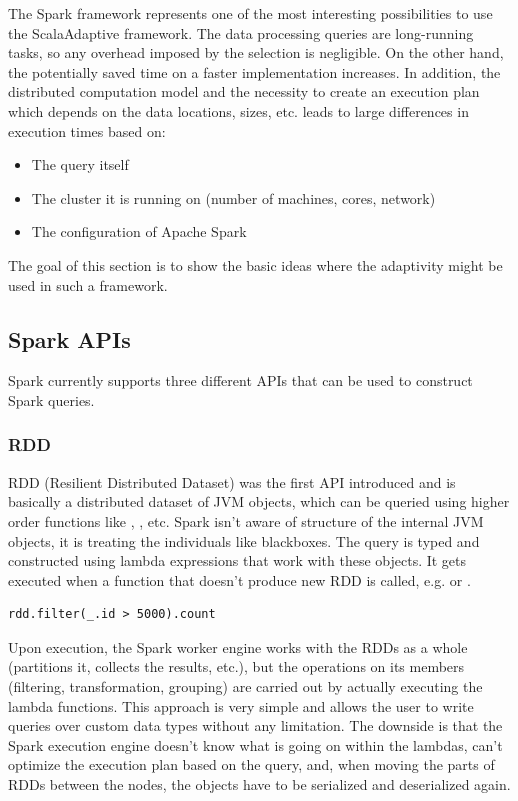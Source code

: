 The Spark framework represents one of the most interesting possibilities to use the ScalaAdaptive framework. The data processing queries are long-running tasks, so any overhead imposed by the selection is negligible. On the other hand, the potentially saved time on a faster implementation increases. In addition, the distributed computation model and the necessity to create an execution plan which depends on the data locations, sizes, etc. leads to large differences in execution times based on:

\begin{itemize}
	\item The query itself
	\item The cluster it is running on (number of machines, cores, network)
	\item The configuration of Apache Spark
\end{itemize}

The goal of this section is to show the basic ideas where the adaptivity might be used in such a framework.

\subsection{Spark APIs}

Spark currently supports three different APIs that can be used to construct Spark queries.

\subsubsection{RDD}

RDD (Resilient Distributed Dataset) was the first API introduced and is basically a distributed dataset of JVM objects, which can be queried using higher order functions like , , etc. Spark isn't aware of structure of the internal JVM objects, it is treating the individuals like blackboxes. The query is typed and constructed using lambda expressions that work with these objects. It gets executed when a function that doesn't produce new RDD is called, e.g.  or . 

\lstset{style=Scala}
\begin{lstlisting}
rdd.filter(_.id > 5000).count
\end{lstlisting}

Upon execution, the Spark worker engine works with the RDDs as a whole (partitions it, collects the results, etc.), but the operations on its members (filtering, transformation, grouping) are carried out by actually executing the lambda functions. This approach is very simple and allows the user to write queries over custom data types without any limitation. The downside is that the Spark execution engine doesn't know what is going on within the lambdas, can't optimize the execution plan based on the query, and, when moving the parts of RDDs between the nodes, the objects have to be serialized and deserialized again.

